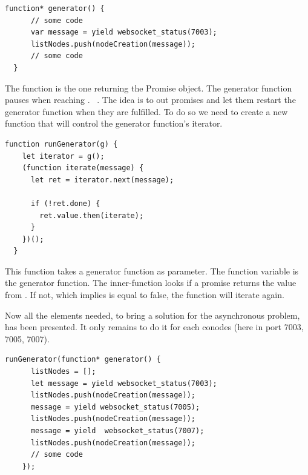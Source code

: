 \documentclass[11pt, a4paper, twoside, openright, openany]{book} %
\begin{document}
\begin{lstlisting}[caption={Extract from the project's code}, captionpos=b]
  function* generator() {
      // some code
      var message = yield websocket_status(7003);
      listNodes.push(nodeCreation(message));
      // some code
  }
\end{lstlisting}
\leavevmode \newline

The function  is the one returning the Promise object. The generator function
pauses when reaching . ~\cite{runGenerator}.
The idea is to  out promises and let them restart the generator function when
they are fulfilled. To do so we need to create a new function that will control the generator function's iterator.
\bigbreak

\begin{lstlisting}[caption={Extract from the project's code~\cite{runGenerator}}, captionpos=b]
  function runGenerator(g) {
    let iterator = g();
    (function iterate(message) {
      let ret = iterator.next(message);

      if (!ret.done) {
        ret.value.then(iterate);
      }
    })();
  }
\end{lstlisting}
\leavevmode \newline

This function takes a generator function as parameter. The  function
variable is the generator function. The inner-function  looks if
a promise returns the value  from .
If not, which implies  is equal to false, the function will iterate again.

Now all the elements needed, to bring a solution for the asynchronous problem, has
been presented. It only remains to do it for each conodes (here in port 7003, 7005, 7007).
\bigbreak

\begin{lstlisting}[caption={Extract from the project's code reaching conodes at port 7003, 7005 and 7007}, captionpos=b]
  runGenerator(function* generator() {
      listNodes = [];
      let message = yield websocket_status(7003);
      listNodes.push(nodeCreation(message));
      message = yield websocket_status(7005);
      listNodes.push(nodeCreation(message));
      message = yield  websocket_status(7007);
      listNodes.push(nodeCreation(message));
      // some code
    });
\end{lstlisting}
\leavevmode \newline
\end{document}
